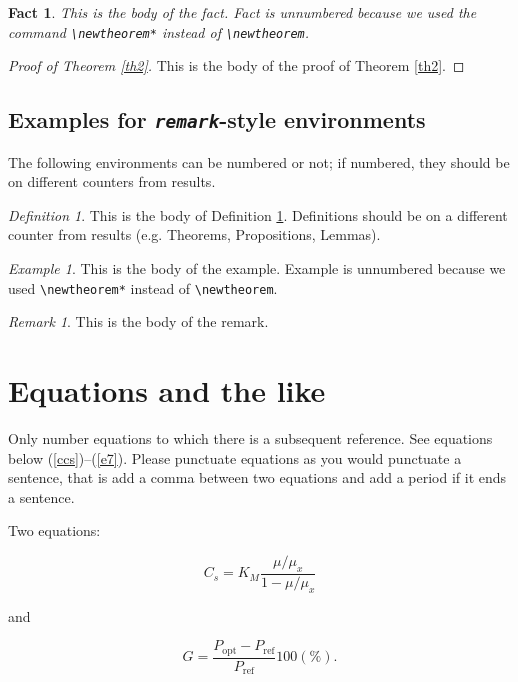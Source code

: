 \documentclass[qe,nameyear,draft]{econsocart}
\theoremstyle{plain}
\newtheorem*{fact}{Fact}
\theoremstyle{remark}
\newtheorem{definition}{Definition}
\newtheorem*{example}{Example}
\newtheorem{remark}{Remark}
\begin{document}
\begin{fact}
This is the body of the fact. Fact is unnumbered because we used the command \verb|\newtheorem*|
instead of \verb|\newtheorem|.
\end{fact}

\begin{proof}[Proof of Theorem \ref{th2}]
This is the body of the proof of Theorem \ref{th2}.
\end{proof}
\subsection{Examples for \textit{\texttt{remark}}-style environments}

The following environments can be numbered or not; if numbered, they should be on different counters from results.


\begin{definition}\label{de1}
This is the body of Definition \ref{de1}. Definitions should be on a different counter from results (e.g. Theorems, Propositions, Lemmas).
\end{definition}

\begin{example}
This is the body of the example. Example is unnumbered because we used \verb|\newtheorem*|
instead of \verb|\newtheorem|.
\end{example}

\begin{remark}
This is the body of the remark. 
\end{remark}
\section{Equations and the like}

Only number equations to which there is a subsequent reference.
See equations below (\ref{ccs})--(\ref{e7}). Please punctuate equations as you would punctuate a sentence, that is add a comma between two equations and add a period if it ends a sentence.

Two equations:

\begin{equation}
\label{ccs}
C_{s}  =  K_{M} \frac{\mu/\mu_{x}}{1-\mu/\mu_{x}}
\end{equation}

and

\begin{equation}
G = \frac{P_{\mathrm{opt}} - P_{\mathrm{ref}}}{P_{\mathrm{ref}}}  100(\%).
\end{equation}
\end{document}
